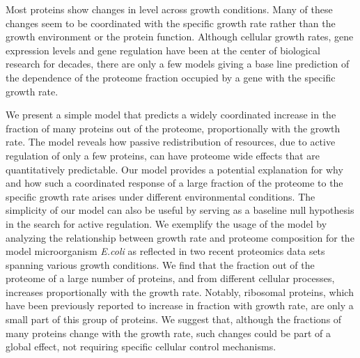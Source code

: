 Most proteins show changes in level across growth conditions.
Many of these changes seem to be coordinated with the specific growth rate rather than the growth environment or the protein function.
Although cellular growth rates, gene expression levels and gene regulation have been at the center of biological research for decades, there are only a few models giving a base line prediction of the dependence of the proteome fraction occupied by a gene with the specific growth rate.

We present a simple model that predicts a widely coordinated increase in the fraction of many proteins out of the proteome, proportionally with the growth rate.
The model reveals how passive redistribution of resources, due to active regulation of only a few proteins, can have proteome wide effects that are quantitatively predictable.
Our model provides a potential explanation for why and how such a coordinated response of a large fraction of the proteome to the specific growth rate arises under different environmental conditions.
The simplicity of our model can also be useful by serving as a baseline null hypothesis in the search for active regulation.
We exemplify the usage of the model by analyzing the relationship between growth rate and proteome composition for the model microorganism \emph{E.coli} as reflected in two recent proteomics data sets spanning various growth conditions.
We find that the fraction out of the proteome of a large number of proteins, and from different cellular processes, increases proportionally with the growth rate.
Notably, ribosomal proteins, which have been previously reported to increase in fraction with growth rate, are only a small part of this group of proteins.
We suggest that, although the fractions of many proteins change with the growth rate, such changes could be part of a global effect, not requiring specific cellular control mechanisms.